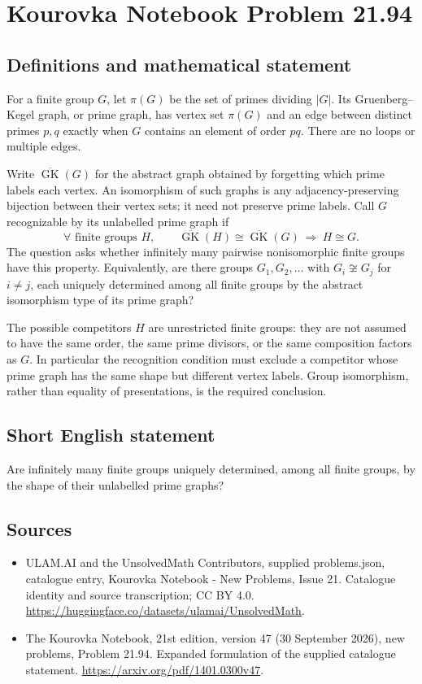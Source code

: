 \documentclass[11pt,a4paper]{article}
\begin{document}
\section*{Kourovka Notebook Problem 21.94}\label{statement}

\subsection{Definitions and mathematical statement}
For a finite group $G$, let $\pi(G)$ be the set of primes dividing $|G|$. Its Gruenberg--Kegel graph, or prime graph, has vertex set $\pi(G)$ and an edge between distinct primes $p,q$ exactly when $G$ contains an element of order $pq$. There are no loops or multiple edges.

Write $\overline{\operatorname{GK}}(G)$ for the abstract graph obtained by forgetting which prime labels each vertex. An isomorphism of such graphs is any adjacency-preserving bijection between their vertex sets; it need not preserve prime labels. Call $G$ recognizable by its unlabelled prime graph if
\[
 \forall\text{ finite groups }H,\qquad
 \overline{\operatorname{GK}}(H)\cong
 \overline{\operatorname{GK}}(G)\ \Longrightarrow\ H\cong G.
\]
The question asks whether infinitely many pairwise nonisomorphic finite groups have this property. Equivalently, are there groups $G_1,G_2,\ldots$ with $G_i\not\cong G_j$ for $i\ne j$, each uniquely determined among all finite groups by the abstract isomorphism type of its prime graph?

The possible competitors $H$ are unrestricted finite groups: they are not assumed to have the same order, the same prime divisors, or the same composition factors as $G$. In particular the recognition condition must exclude a competitor whose prime graph has the same shape but different vertex labels. Group isomorphism, rather than equality of presentations, is the required conclusion.
\subsection{Short English statement}
Are infinitely many finite groups uniquely determined, among all finite groups, by the shape of their unlabelled prime graphs?
\subsection{Sources}
\begin{itemize}
\item[S1] ULAM.AI and the UnsolvedMath Contributors, supplied problems.json, catalogue entry, Kourovka Notebook - New Problems, Issue 21. Catalogue identity and source transcription; CC BY 4.0.
\url{https://huggingface.co/datasets/ulamai/UnsolvedMath}.
\item[S2] The Kourovka Notebook, 21st edition, version 47 (30 September 2026), new problems, Problem 21.94. Expanded formulation of the supplied catalogue statement.
\url{https://arxiv.org/pdf/1401.0300v47}.
\end{itemize}
\end{document}
